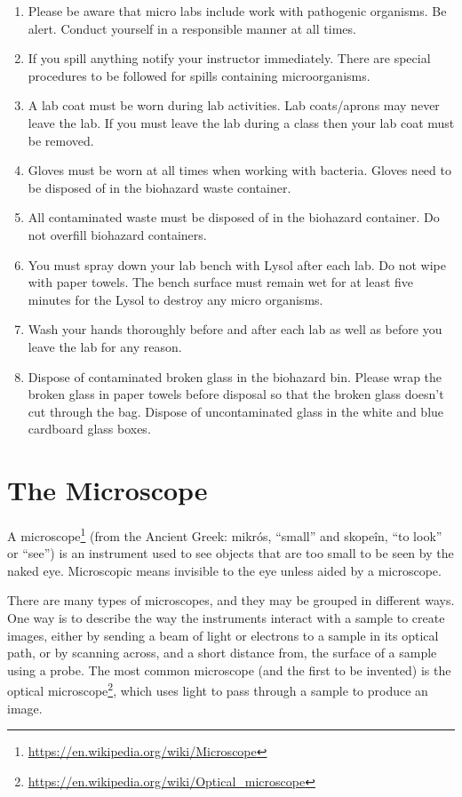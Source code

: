 \documentclass[]{book}
\providecommand{\tightlist}{%
  \setlength{\itemsep}{0pt}\setlength{\parskip}{0pt}}
\let\rmarkdownfootnote\footnote%
\def\footnote{\protect\rmarkdownfootnote}
\renewcommand{\href}[2]{#2\footnote{\url{#1}}}
\begin{document}
\begin{enumerate}
\def\labelenumi{\arabic{enumi}.}
\setcounter{enumi}{37}
\tightlist
\item
  Please be aware that micro labs include work with pathogenic organisms. Be alert. Conduct yourself in a responsible manner at all times.
\item
  If you spill anything notify your instructor immediately. There are special procedures to be followed for spills containing microorganisms.
\item
  A lab coat must be worn during lab activities. Lab coats/aprons may never leave the lab. If you must leave the lab during a class then your lab coat must be removed.
\item
  Gloves must be worn at all times when working with bacteria. Gloves need to be disposed of in the biohazard waste container.
\item
  All contaminated waste must be disposed of in the biohazard container. Do not overfill biohazard containers.
\item
  You must spray down your lab bench with Lysol after each lab. Do not wipe with paper towels. The bench surface must remain wet for at least five minutes for the Lysol to destroy any micro organisms.
\item
  Wash your hands thoroughly before and after each lab as well as before you leave the lab for any reason.
\item
  Dispose of contaminated broken glass in the biohazard bin. Please wrap the broken glass in paper towels before disposal so that the broken glass doesn't cut through the bag. Dispose of uncontaminated glass in the white and blue cardboard glass boxes.
\end{enumerate}

\hypertarget{the-microscope}{%
\chapter{The Microscope}\label{the-microscope}}

A \href{https://en.wikipedia.org/wiki/Microscope}{microscope} (from the Ancient Greek: mikrós, ``small'' and skopeîn, ``to look'' or ``see'') is an instrument used to see objects that are too small to be seen by the naked eye. Microscopic means invisible to the eye unless aided by a microscope.

There are many types of microscopes, and they may be grouped in different ways. One way is to describe the way the instruments interact with a sample to create images, either by sending a beam of light or electrons to a sample in its optical path, or by scanning across, and a short distance from, the surface of a sample using a probe. The most common microscope (and the first to be invented) is the \href{https://en.wikipedia.org/wiki/Optical_microscope}{optical microscope}, which uses light to pass through a sample to produce an image.
\end{document}
